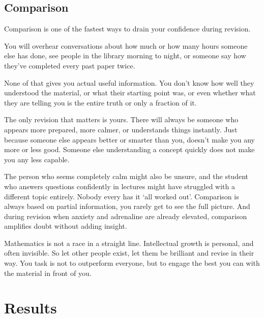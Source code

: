 \subsection{Comparison}

Comparison is one of the fastest ways to drain your confidence during revision. 

You will overhear conversations about how much or how many hours someone else has done, see people in the library morning to night, or someone say how they've completed every past paper twice. 

None of that gives you actual useful information. You don't know how well they understood the material, or what their starting point was, or even whether what they are telling you is the entire truth or only a fraction of it. 

The only revision that matters is yours. There will always be someone who appears more prepared, more calmer, or understands things instantly. Just because someone else appears better or smarter than you, doesn't make you any more or less good. Someone else understanding a concept quickly does not make you any less capable. 

The person who seems completely calm might also be unsure, and the student who answers questions confidently in lectures might have struggled with a different topic entirely. Nobody every has it `all worked out'. Comparison is always based on partial information, you rarely get to see the full picture. And during revision when anxiety and adrenaline are already elevated, comparison amplifies doubt without adding insight. 

Mathematics is not a race in a straight line. Intellectual growth is personal, and often invisible. So let other people exist, let them be brilliant and revise in their way. You task is not to outperform everyone, but to engage the best you can with the material in front of you. 

\section{Results}

